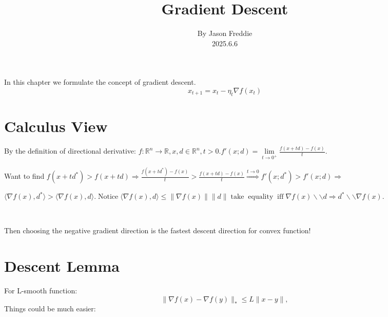 \documentclass{article}
\newcommand{\tmaffiliation}[1]{\\ #1}
\newcommand{\tmop}[1]{\ensuremath{\operatorname{#1}}}
\begin{document}
\begin{CJK*}{UTF8}{gbsn}

\title{Gradient Descent}

\author{
  By Jason Freddie
  \tmaffiliation{2025.6.6}
}

\maketitle

In this chapter we formulate the concept of gradient descent.
\begin{equation}
  x_{t + 1} = x_t - \eta_t \nabla f (x_t)
\end{equation}

\section{Calculus View}

By the definition of directional derivative: $f : \mathbb{R}^n  \rightarrow
\mathbb{R}, x, d \in \mathbb{R}^n, t > 0. f' (x ; d) = \underset{t \rightarrow
0^+}{\lim} \frac{f (x + t d) - f (x)}{t} .$

Want to find $f (x + t d^{\ast}) > f (x + t d) \Rightarrow \frac{f (x + t
d^{\ast}) - f (x)}{t} > \frac{f (x + t d) - f (x)}{t} \overset{t \rightarrow
0}{\Rightarrow} f' (x ; d^{\ast}) > f' (x ; d) \Rightarrow$

$\langle \nabla f (x), d^{\ast} \rangle > \langle \nabla f (x), d \rangle .
\tmop{Notice} \langle \nabla f (x), d \rangle \leqslant \| \nabla f (x) \|  \|
d \| \tmop{take} \tmop{equality} \tmop{iff} \nabla f (x) \backslash \backslash
d \Rightarrow d^{\ast} \backslash \backslash \nabla f (x) .$

\

Then choosing the negative gradient direction is the fastest descent
direction for convex function!


\section{ Descent Lemma}

For L-smooth function:
\begin{equation}
  \| \nabla f (x) - \nabla f (y) \|_{\ast} \leqslant L \| x - y \|,
\end{equation}
Things could be much easier:


\end{CJK*}
\end{document}
